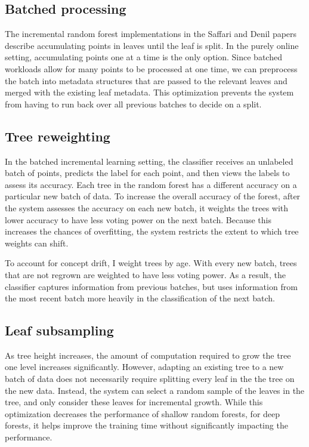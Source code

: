 \subsection{Batched processing}

The incremental random forest implementations in the Saffari and Denil papers
describe accumulating points in leaves until the leaf is split. In the purely
online setting, accumulating points one at a time is the only option. Since
batched workloads allow for many points to be processed at one time, we can
preprocess the batch into metadata structures that are passed to the relevant
leaves and merged with the existing leaf metadata. This optimization prevents
the system from having to run back over all previous batches to decide on a
split.

\subsection{Tree reweighting}

In the batched incremental learning setting, the classifier receives an
unlabeled batch of points, predicts the label for each point, and then views
the labels to assess its accuracy. Each tree in the random forest has a
different accuracy on a particular new batch of data. To increase the overall
accuracy of the forest, after the system assesses the accuracy on each new
batch, it weights the trees with lower accuracy to have less voting power on
the next batch. Because this increases the chances of overfitting, the system
restricts the extent to which tree weights can shift.

To account for concept drift, I weight trees by age. With every new batch,
trees that are not regrown are weighted to have less voting power. As a result,
the classifier captures information from previous batches, but uses information
from the most recent batch more heavily in the classification of the next
batch.

\subsection{Leaf subsampling}

As tree height increases, the amount of computation required to grow the tree
one level increases significantly. However, adapting an existing tree to a new
batch of data does not necessarily require splitting every leaf in the the tree
on the new data. Instead, the system can select a random sample of the leaves
in the tree, and only consider these leaves for incremental growth. While this
optimization decreases the performance of shallow random forests, for deep
forests, it helps improve the training time without significantly impacting the
performance.

